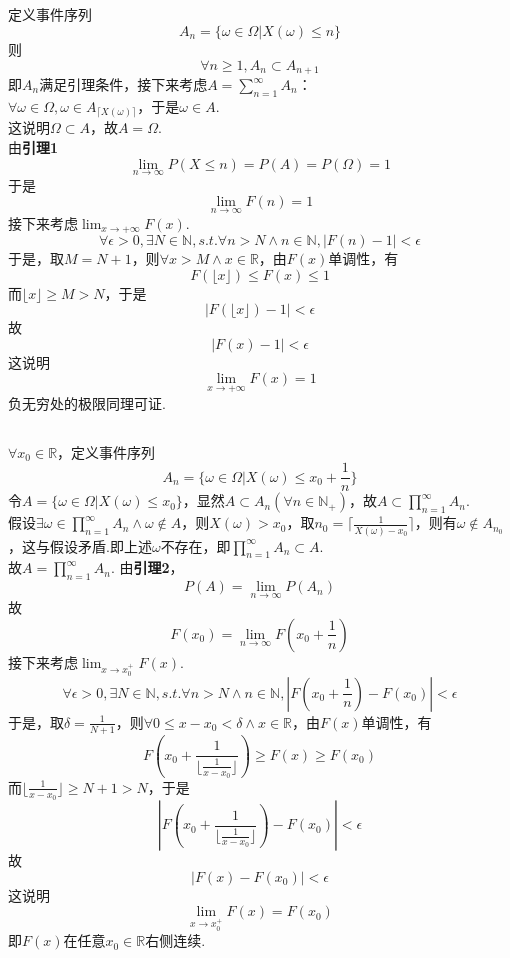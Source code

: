 \documentclass{article}
\begin{document}
\begin{CJK}{UTF8}{gbsn}
\subsection{}
定义事件序列
$$ A_{n}=\{\omega\in\Omega|X(\omega)\leq n\} $$
则
$$ \forall n\geq 1, A_{n}\subset A_{n+1} $$
即$A_{n}$满足引理条件，接下来考虑$A=\sum\limits_{n=1}^{\infty}A_{n}$：\\
$\forall \omega\in\Omega,\omega\in A_{\lceil X(\omega)\rceil}$，于是$\omega\in A$.
\\这说明$\Omega\subset A$，故$A=\Omega$.
\\由\textbf{引理1}
$$ \lim_{n\to \infty}P(X\leq n)=P(A)=P(\Omega)=1 $$
于是
$$ \lim_{n\to \infty}F(n)=1 $$
接下来考虑$\lim_{x\to +\infty}F(x)$.
$$\forall\epsilon>0,\exists N\in \mathbb{N},s.t.\forall n>N\land n\in\mathbb{N},|F(n)-1|<\epsilon $$
于是，取$M=N+1$，则$\forall x>M\land x\in\mathbb{R}$，由$F(x)$单调性，有
$$ F(\lfloor x\rfloor)\leq F(x) \leq 1$$
而$\lfloor x\rfloor\geq M>N$，于是
$$ |F(\lfloor x \rfloor)-1|<\epsilon $$
故
$$ |F(x)-1|<\epsilon $$
这说明
$$ \lim_{x\to +\infty}F(x)=1 $$
负无穷处的极限同理可证.
\subsection{}
$\forall x_{0}\in \mathbb{R}$，定义事件序列
$$A_{n}=\{\omega\in\Omega|X(\omega)\leq x_{0}+\frac{1}{n}\} $$
令$A=\{\omega\in\Omega|X(\omega)\leq x_{0}\}$，显然$A\subset A_{n}(\forall n\in\mathbb{N_{+}})$，故$A\subset\prod\limits_{n=1}^{\infty}A_{n}$.\\
假设$\exists\omega\in\prod\limits_{n=1}^{\infty}A_{n}\land\omega\notin A$，则$X(\omega)>x_{0}$，取$n_{0}=\lceil\frac{1}{X(\omega)-x_{0}}\rceil$，则有$\omega\notin A_{n_{0}}$，这与假设矛盾.即上述$\omega$不存在，即$\prod\limits_{n=1}^{\infty}A_{n}\subset A$.\\
故$A=\prod\limits_{n=1}^{\infty}A_{n}$.
由\textbf{引理2}，
$$P(A)=\lim_{n\to \infty}P(A_{n})$$
故
$$F(x_{0})=\lim_{n\to\infty}F(x_{0}+\frac{1}{n})$$
接下来考虑$\lim_{x\to x_{0}^{+}}F(x)$.
$$\forall\epsilon>0,\exists N\in \mathbb{N},s.t.\forall n>N\land n\in\mathbb{N},|F(x_{0}+\frac{1}{n})-F(x_{0})|<\epsilon $$
于是，取$\delta=\frac{1}{N+1}$，则$\forall 0\leq x-x_{0}<\delta\land x\in\mathbb{R}$，由$F(x)$单调性，有
$$ F(x_{0}+\frac{1}{\lfloor\frac{1}{x-x_{0}}\rfloor})\geq F(x) \geq F(x_{0})$$
而$\lfloor\frac{1}{x-x_{0}}\rfloor\geq N+1>N$，于是
$$ |F(x_{0}+\frac{1}{\lfloor\frac{1}{x-x_{0}}\rfloor})-F(x_{0})|<\epsilon $$
故
$$ |F(x)-F(x_{0})|<\epsilon $$
这说明
$$ \lim_{x\to x_{0}^{+}}F(x)=F(x_{0}) $$
即$F(x)$在任意$x_{0}\in\mathbb{R}$右侧连续.

\end{CJK}
\end{document}
